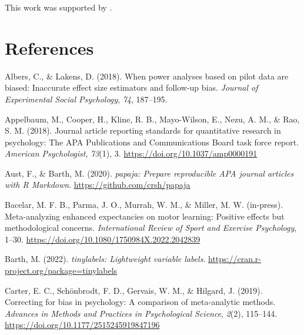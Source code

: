 \documentclass[
  man, donotrepeattitle,mask,floatsintext]{apa7}
\newlength{\cslhangindent}
\newlength{\cslentryspacingunit} %
\newenvironment{CSLReferences}[2] %
 {%
  \setlength{\parindent}{0pt}
  \ifodd #1
  \let\oldpar\par
  \def\par{\hangindent=\cslhangindent\oldpar}
  \fi
  \setlength{\parskip}{#2\cslentryspacingunit}
 }%
 {}
\begin{document}
\noindent This work was supported by .

\pagebreak

\hypertarget{references}{%
\section{References}\label{references}}

\vspace{2ex}

\hypertarget{refs}{}
\begin{CSLReferences}{1}{0}
\leavevmode{}%
Albers, C., \& Lakens, D. (2018). When power analyses based on pilot data are biased: Inaccurate effect size estimators and follow-up bias. \emph{Journal of Experimental Social Psychology}, \emph{74}, 187--195.

\leavevmode{}%
Appelbaum, M., Cooper, H., Kline, R. B., Mayo-Wilson, E., Nezu, A. M., \& Rao, S. M. (2018). Journal article reporting standards for quantitative research in psychology: {The} {APA} {Publications} and {Communications} {Board} task force report. \emph{American Psychologist}, \emph{73}(1), 3. \url{https://doi.org/10.1037/amp0000191}

\leavevmode{}%
Aust, F., \& Barth, M. (2020). \emph{{papaja}: {Prepare} reproducible {APA} journal articles with {R Markdown}}. \url{https://github.com/crsh/papaja}

\leavevmode{}%
Bacelar, M. F. B., Parma, J. O., Murrah, W. M., \& Miller, M. W. (in-press). Meta-analyzing enhanced expectancies on motor learning: Positive effects but methodological concerns. \emph{International Review of Sport and Exercise Psychology}, 1--30. \url{https://doi.org/10.1080/1750984X.2022.2042839}

\leavevmode{}%
Barth, M. (2022). \emph{{tinylabels}: Lightweight variable labels}. \url{https://cran.r-project.org/package=tinylabels}

\leavevmode{}%
Carter, E. C., Schönbrodt, F. D., Gervais, W. M., \& Hilgard, J. (2019). Correcting for bias in psychology: A comparison of meta-analytic methods. \emph{Advances in Methods and Practices in Psychological Science}, \emph{2}(2), 115--144. \url{https://doi.org/10.1177/2515245919847196}


\end{CSLReferences}
\end{document}
